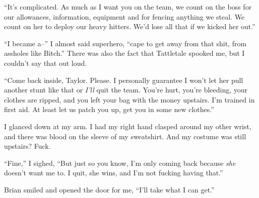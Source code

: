 ``It's complicated.  As much as I want you on the team, we count on the boss for our allowances, information, equipment and for fencing anything we steal.  We count on her to deploy our heavy hitters.  We'd lose all that if we kicked her out.''



``I became a--'' I almost said superhero, ``cape to get away from that shit, from assholes like Bitch.''  There was also the fact that Tattletale spooked me, but I couldn't say that out loud.



``Come back inside, Taylor.  Please.  I personally guarantee I won't let her pull another stunt like that or \emph{I'll} quit the team.  You're hurt, you're bleeding, your clothes are ripped, and you left your bag with the money upstairs.  I'm trained in first aid.  At least let us patch you up, get you in some new clothes.''



I glanced down at my arm.  I had my right hand clasped around my other wrist, and there was blood on the sleeve of my sweatshirt.  And my costume was still upstairs?  Fuck.



``Fine,'' I sighed, ``But just so you know, I'm only coming back because \emph{she} doesn't want me to.  I quit, she wins, and I'm not fucking having that.''



Brian smiled and opened the door for me, ``I'll take what I can get.''





